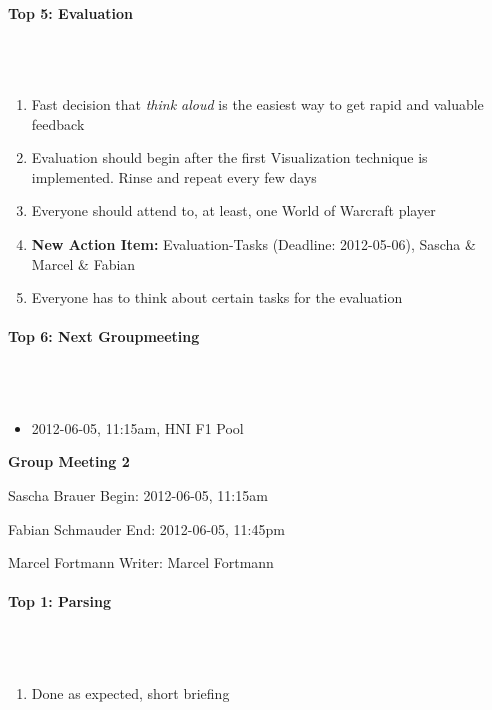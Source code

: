 \documentclass{scrartcl}
\begin{document}
\paragraph{Top 5: Evaluation}
\hfill \\ \hfill \\
\begin {enumerate}
\item Fast decision that \emph{think aloud} is the easiest way to get rapid and valuable feedback
\item Evaluation should begin after the first Visualization technique is implemented. Rinse and repeat every few days
\item Everyone should attend to, at least, one World of Warcraft player
\item \textbf{New Action Item:} Evaluation-Tasks (Deadline: 2012-05-06), Sascha \& Marcel \& Fabian
\item Everyone has to think about certain tasks for the evaluation
\end {enumerate}

\paragraph{Top 6: Next Groupmeeting}
\hfill \\ \hfill \\
\begin{itemize}
\item 2012-06-05, 11:15am, HNI F1 Pool
\end{itemize}

\clearpage

\begin{center}
{\huge \textbf{Group Meeting 2}}\\
\end{center}
\begin{description}
\item Sascha Brauer \hfill Begin: 2012-06-05, 11:15am 
\item Fabian Schmauder \hfill End: 2012-06-05, 11:45pm
\item Marcel Fortmann \hfill Writer: Marcel Fortmann
\end{description}

\paragraph{Top 1: Parsing}
\hfill \\ \hfill \\
\begin {enumerate}
\item Done as expected, short briefing
\end {enumerate}
\end{document}
